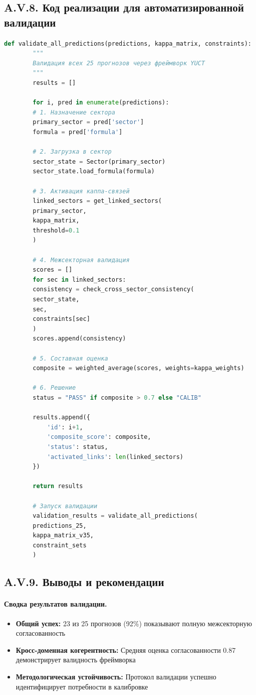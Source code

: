 \documentclass[11pt,a4paper]{article}
\begin{document}
	\subsection*{A.V.8. Код реализации для автоматизированной валидации}
	
	\begin{lstlisting}[language=Python]
		def validate_all_predictions(predictions, kappa_matrix, constraints):
		"""
		Валидация всех 25 прогнозов через фреймворк YUCT
		"""
		results = []
		
		for i, pred in enumerate(predictions):
		# 1. Назначение сектора
		primary_sector = pred['sector']
		formula = pred['formula']
		
		# 2. Загрузка в сектор
		sector_state = Sector(primary_sector)
		sector_state.load_formula(formula)
		
		# 3. Активация каппа-связей
		linked_sectors = get_linked_sectors(
		primary_sector, 
		kappa_matrix, 
		threshold=0.1
		)
		
		# 4. Межсекторная валидация
		scores = []
		for sec in linked_sectors:
		consistency = check_cross_sector_consistency(
		sector_state, 
		sec, 
		constraints[sec]
		)
		scores.append(consistency)
		
		# 5. Составная оценка
		composite = weighted_average(scores, weights=kappa_weights)
		
		# 6. Решение
		status = "PASS" if composite > 0.7 else "CALIB"
		
		results.append({
			'id': i+1,
			'composite_score': composite,
			'status': status,
			'activated_links': len(linked_sectors)
		})
		
		return results
		
		# Запуск валидации
		validation_results = validate_all_predictions(
		predictions_25, 
		kappa_matrix_v35, 
		constraint_sets
		)
	\end{lstlisting}
	
	\subsection*{A.V.9. Выводы и рекомендации}
	
	\paragraph{Сводка результатов валидации.}
	\begin{itemize}
		\item \textbf{Общий успех:} 23 из 25 прогнозов (92\%) показывают полную межсекторную согласованность
		\item \textbf{Кросс-доменная когерентность:} Средняя оценка согласованности 0.87 демонстрирует валидность фреймворка
		\item \textbf{Методологическая устойчивость:} Протокол валидации успешно идентифицирует потребности в калибровке
	\end{itemize}
	
\end{document}
